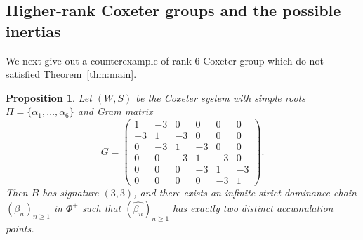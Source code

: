 \documentclass[11pt,reqno]{amsart}
\theoremstyle{plain}
\newtheorem{proposition}[theorem]{Proposition}
\theoremstyle{definition}
\theoremstyle{remark}
\numberwithin{equation}{section}
\begin{document}
\subsection{Higher-rank Coxeter groups and the possible inertias}

We next give out a counterexample of rank $6$ Coxeter group which do not satisfied Theorem~\ref{thm:main}.
\begin{proposition}
Let $(W,S)$ be the Coxeter system with simple roots
$\Pi=\{\alpha_1,\ldots,\alpha_6\}$ and Gram matrix
\[
G=
\begin{pmatrix}
1&-3&0&0&0&0\\
-3&1&-3&0&0&0\\
0&-3&1&-3&0&0\\
0&0&-3&1&-3&0\\
0&0&0&-3&1&-3\\
0&0&0&0&-3&1
\end{pmatrix}.
\]
Then $B$ has signature $(3,3)$, and there exists an infinite strict
dominance chain $(\beta_n)_{n\geq1}$ in $\Phi^+$ such that
$(\widehat{\beta_n})_{n\geq1}$ has exactly two distinct accumulation
points.
\end{proposition}
\end{document}
